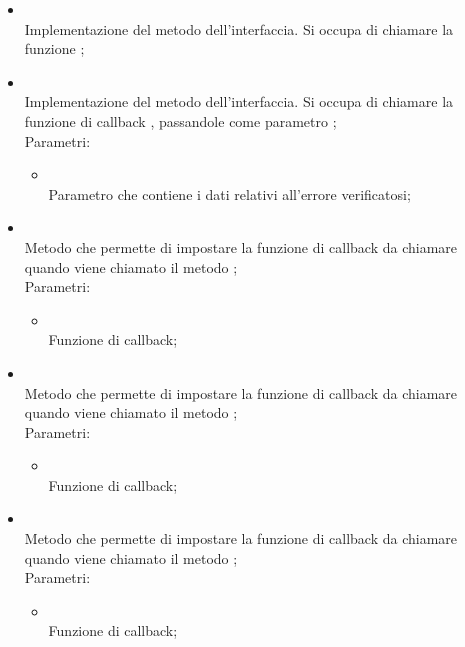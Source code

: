 \begin{itemize}
\begin{itemize}
		\item[]  \\		Implementazione del metodo dell'interfaccia. Si occupa di chiamare la funzione ;\\
		\item[]  \\		Implementazione del metodo dell'interfaccia. Si occupa di chiamare la funzione di callback , passandole come parametro ;\\
		Parametri:
		\begin{itemize}
			\item {} \\
			Parametro che contiene i dati relativi all'errore verificatosi;
		\end{itemize}
		\item[]  \\		Metodo che permette di impostare la funzione di callback da chiamare quando viene chiamato il metodo ;\\
		Parametri:
		\begin{itemize}
			\item {} \\
			Funzione di callback;
		\end{itemize}
		\item[]  \\		Metodo che permette di impostare la funzione di callback da chiamare quando viene chiamato il metodo ;\\
		Parametri:
		\begin{itemize}
			\item {} \\
			Funzione di callback;
		\end{itemize}
		\item[]  \\		Metodo che permette di impostare la funzione di callback da chiamare quando viene chiamato il metodo ;\\
		Parametri:
		\begin{itemize}
			\item {} \\
			Funzione di callback;
		\end{itemize}
	\end{itemize}
\end{itemize}
\FloatBarrier

